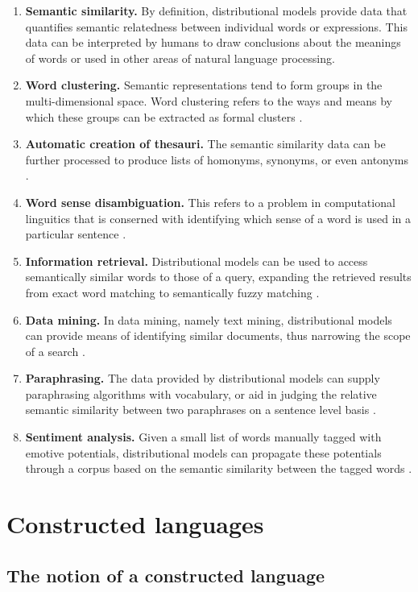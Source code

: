\documentclass[14pt, a4paper]{extreport}
\begin{document}
\begin{enumerate}
  \item \textbf{Semantic similarity.} By definition, distributional models provide data that quantifies semantic relatedness between individual words or expressions. This data can be interpreted by humans to draw conclusions about the meanings of words or used in other areas of natural language processing.
  \item \textbf{Word clustering.} Semantic representations tend to form groups in the multi-dimensional space. Word clustering refers to the ways and means by which these groups can be extracted as formal clusters \parencite{bekkerman}.
  \item \textbf{Automatic creation of thesauri.} The semantic similarity data can be further processed to produce lists of homonyms, synonyms, or even antonyms \parencite{henestroza}.
  \item \textbf{Word sense disambiguation.} This refers to a problem in computational linguitics that is conserned with identifying which sense of a word is used in a particular sentence \parencite{musto}.
  \item \textbf{Information retrieval.} Distributional models can be used to access semantically similar words to those of a query, expanding the retrieved results from exact word matching to semantically fuzzy matching \parencite{silva}.
  \item \textbf{Data mining.} In data mining, namely text mining, distributional models can provide means of identifying similar documents, thus narrowing the scope of a search \parencite[89]{dalianis}.
  \item \textbf{Paraphrasing.} The data provided by distributional models can supply paraphrasing algorithms with vocabulary, or aid in judging the relative semantic similarity between two paraphrases on a sentence level basis \parencite{desouki}.
  \item \textbf{Sentiment analysis.} Given a small list of words manually tagged with emotive potentials, distributional models can propagate these potentials through a corpus based on the semantic similarity between the tagged words \parencite{alshari}.
\end{enumerate}


\section{Constructed languages}

\subsection{The notion of a constructed language}
\end{document}
